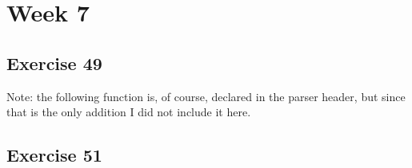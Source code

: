 



\section*{Week 7}
\subsection*{Exercise 49}
Note: the following function is, of course, declared in the parser header, but since that is the only addition I did not include it here.

\newpage

\subsection*{Exercise 51}


